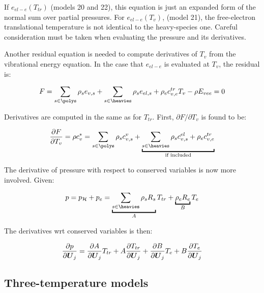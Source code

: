 \documentclass[10pt]{article}
\begin{document}
\begin{flushleft}
If $e_{el-e} (T_{tr})$ (models 20 and 22), this equation is just an expanded form of the normal sum over partial pressures. For $e_{el-e} (T_{v})$, (model 21), the free-electron translational temperature is not identical to the heavy-species one. Careful consideration must be taken when evaluating the pressure and its derivatives.


\begin{derivation}
    Another residual equation is needed to compute derivatives of $T_v$ from the vibrational energy equation. In the case that $e_{el-e}$ is evaluated at $T_v$, the residual is:

    \begin{equation}
        F = \sum_{s \in \polys} \rho_s e_{v,s} + \sum_{s \in \heavies} \rho_s e_{el,s} + \rho_e c_{v,e}^{tr} T_v - \rho E_{vee} = 0
    \end{equation}

    Derivatives are computed in the same as for $T_{tr}$. First, $\partial F / \partial T_v$ is found to be:

    \begin{equation*}
        \pd{F}{T_v} = \rho c_v^* = \sum_{s \in \polys} \rho_s c_{v,s}^v + \ub{ \sum_{s \in \heavies} \rho_s c_{v,s}^{el} + \rho_e c_{v,e}^{tr}}{\text{if included}}
    \end{equation*}
\end{derivation}


\begin{derivation}
    The derivative of pressure with respect to conserved variables is now more involved. Given:

    \begin{equation*}
        p = p_\mathcal{H} + p_e = \ub{\sum_{s \in \heavies} \rho_s R_s}{A} T_{tr} + \ub{\rho_e R_e}{B} T_e
    \end{equation*}

    The derivatives wrt conserved variables is then:

    \begin{equation*}
        \frac{\partial p}{\partial \boldsymbol{U}_j} = \frac{\partial A}{\partial \boldsymbol{U}_j} T_{tr} + A \frac{\partial T_{tr}}{\partial \boldsymbol{U}_j} + \frac{\partial B}{\partial \boldsymbol{U}_j} T_e + B \frac{\partial T_e}{\partial \boldsymbol{U}_j}
    \end{equation*}
\end{derivation}

\subsection{Three-temperature models}


\end{flushleft}
\end{document}
